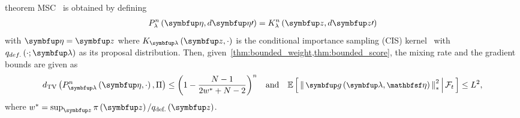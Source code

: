 
\begin{theoremEnd}{theorem}\label{thm:msc}
  MSC~\citep{NEURIPS2020_b2070693} is obtained by defining 
  {%
  \begin{align*}
  P_{\lambda}^n\left(\veta, d\veta\prime\right)
  = 
  K_{\lambda}^n\left(\vz, d\vz\prime\right)
  \end{align*}
  }
  with  \(\veta = \vz\) where \(K_{\vlambda}\left(\vz, \cdot\right)\) is the conditional importance sampling (CIS) kernel~\citep{NEURIPS2020_b2070693} with \(q_{def.}\left(\cdot; \vlambda\right)\) as its proposal distribution.
  Then, given~\cref{thm:bounded_weight,thm:bounded_score}, the mixing rate and the gradient bounds are given as
  {%
  \begin{align*}
  \DTV{P_{\vlambda}^n\left(\veta, \cdot\right)}{\Pi} \leq  {\left(1 - \frac{N - 1}{2 w^* + N - 2}\right)}^n\quad \text{and}\quad
  {\small
  \E{ \norm{ \vg\left(\vlambda, \rvveta\right) }_{*}^2 \,\middle|\, \mathcal{F}_{t} } \leq  L^2,
  }
  \end{align*}
  }
  where \(w^* = \sup_{\vz} \pi\left(\vz\right) / q_{\text{def.}}\left(\vz\right)\).
\end{theoremEnd}
